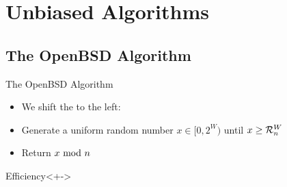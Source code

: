 \section{Unbiased Algorithms}

\subsection{The OpenBSD Algorithm}
\begin{frame}{The OpenBSD Algorithm}
    \pause 
    \begin{itemize}[<+->]
        \item We shift the  to the left:
        \item Generate a uniform random number $x \in [0,2^W)$ until $x \geq \mathcal{R}_n^W$
        \item Return $x \ \mathrm{mod}\ n$
    \end{itemize}

    \begin{block}{Efficiency}<+->
    \end{block}

\end{frame}

\iffalse
\onslide<+->{\begin{center}
    \begin{tikzpicture}[scale = 0.7]
        \draw[draw = goetheblau] (0.0,0.0) rectangle ++(5.0,1.0);
        \draw[draw = goetheblau,overbrace style] (0.0,1.0) -- (5.0,1.0) node [overbrace text style] {\GB{$n$ values}};
        \draw[draw = goetheblau] (5.0,0.0) rectangle ++(5.0,1.0);
        \draw[draw = goetheblau,overbrace style] (5.0,1.0) -- (10.0,1.0) node [overbrace text style] {\GB{$n$ values}};
        \node at (10.5,0.5) {$\cdots$};
        \draw[draw = goetheblau] (11.0,0.0) rectangle ++(5.0,1.0);
        \draw[draw = goetheblau,overbrace style] (11.0,1.0) -- (16.0,1.0) node [overbrace text style] {\GB{$n$ values}};
        \draw[draw = emorot] (16.0,0.0) rectangle ++(3.0,1.0);
        \draw[draw = emorot,overbrace style] (16.0,1.0) -- (19.0,1.0) node [overbrace text style] {$\text{\ER{\RNW values}}$};
    \end{tikzpicture}
\end{center}}
\fi 



